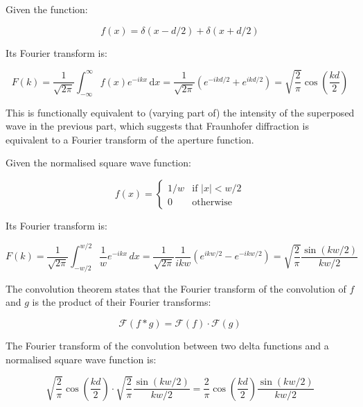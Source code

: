 \documentclass[12pt]{article}
\begin{document}
Given the function:

\begin{equation}
    f(x) = \delta(x - d/2) + \delta(x + d/2)
\end{equation}

Its Fourier transform is:

\begin{equation}
    F(k) = \frac{1}{\sqrt{2\pi}} \int_{-\infty}^{\infty} f(x) e^{-ikx} \, \mathrm{d}x = \frac{1}{\sqrt{2\pi}} \left( e^{-ikd/2} + e^{ikd/2} \right) = \sqrt{\frac{2}{\pi}} \cos{\left( \frac{kd}{2} \right)}
\end{equation}

This is functionally equivalent to (varying part of) the intensity of the superposed wave in the previous part, which suggests that Fraunhofer diffraction is equivalent to a Fourier transform of the aperture function.

Given the normalised square wave function:

\begin{equation}
    f(x) =
    \begin{cases}
        1/w & \text{if } \left\lvert x \right\rvert < w/2 \\
        0   & \text{otherwise}
    \end{cases}
\end{equation}

Its Fourier transform is:

\begin{equation}
    F(k) = \frac{1}{\sqrt{2\pi}} \int_{-w/2}^{w/2} \frac{1}{w} e^{-ikx} \, dx = \frac{1}{\sqrt{2\pi}} \frac{1}{ikw} \left( e^{ikw/2} - e^{-ikw/2} \right) = \sqrt{\frac{2}{\pi}} \frac{\sin{(kw/2)}}{kw/2}
\end{equation}

The convolution theorem states that the Fourier transform of the convolution of $f$ and $g$ is the product of their Fourier transforms:

\begin{equation}
    \mathcal{F}(f * g) = \mathcal{F}(f) \cdot \mathcal{F}(g)
\end{equation}

The Fourier transform of the convolution between two delta functions and a normalised square wave function is:

\begin{equation}
    \sqrt{\frac{2}{\pi}} \cos{\left( \frac{kd}{2} \right)} \cdot \sqrt{\frac{2}{\pi}} \frac{\sin{(kw/2)}}{kw/2} = \frac{2}{\pi} \cos{\left( \frac{kd}{2} \right)} \frac{\sin{(kw/2)}}{kw/2}
\end{equation}
\end{document}
